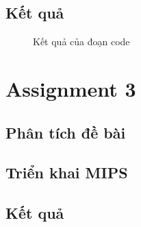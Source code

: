 \documentclass[a4paper,12pt]{article}
\begin{document}
\subsection{Kết quả}
\FloatBarrier
\begin{figure}[ht!]
	\centerline{}
	\caption{Kết quả của đoạn code}
	\label{fig:ass1}
\end{figure}
\clearpage
\section{Assignment 3}
\subsection{Phân tích đề bài}

\subsection{Triển khai MIPS}
\subsection{Kết quả}
\end{document}
